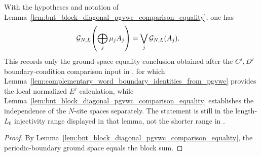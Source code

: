\begin{lemma}
    \label{lem:bnt_block_diagonal_pgvwc_comparison_ground_space}
    \leanok
    With the hypotheses and notation of
    Lemma~\ref{lem:bnt_block_diagonal_pgvwc_comparison_equality}, one has
    \begin{align}
        \mathcal G_{N,L}\!\left(\bigoplus_j\mu_jA_j\right)
         & =
        \bigvee_j\mathcal G_{N,L}(A_j).
        \notag
    \end{align}
    This records only the ground-space equality conclusion obtained after the
    $C^j,D^j$ boundary-condition comparison input in
    \cite[Theorem~12, proof lines~1446--1456]{PerezGarcia2007Matrix}, for which
    Lemma~\ref{lem:complementary_word_boundary_identities_from_pgvwc} provides
    the local normalized $E^j$ calculation, while
    Lemma~\ref{lem:bnt_block_diagonal_pgvwc_comparison_equality} establishes the
    independence of the $N$-site spaces separately.
    The statement is still in the length-$L_0$ injectivity range displayed in
    that lemma, not the shorter range in
    \cite[Theorem~12]{PerezGarcia2007Matrix}.
\end{lemma}

\begin{proof}
    \leanok
    By Lemma~\ref{lem:bnt_block_diagonal_pgvwc_comparison_equality}, the
    periodic-boundary ground space equals the block sum.
\end{proof}

